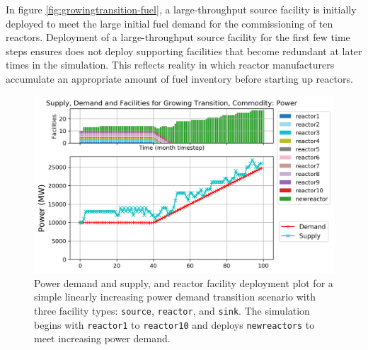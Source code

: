 In figure \ref{fig:growingtransition-fuel},
a large-throughput source facility is initially
deployed to meet the large initial fuel demand for the commissioning 
of ten reactors. 
Deployment of a large-throughput source facility for the 
first few time steps ensures \deploy does not deploy supporting
facilities that become redundant at later times in  
the simulation.
This reflects reality in which reactor manufacturers accumulate
an appropriate amount of fuel inventory before starting 
up reactors. 

\begin{figure}[]
    \centering
    \includegraphics[width=\linewidth]{figures/growingtransition-power.png} 
        \caption{Power demand and supply, and reactor facility deployment plot for  
        a simple linearly increasing power demand transition scenario with 
        three facility types: \texttt{source}, \texttt{reactor}, and \texttt{sink}.
        The simulation begins with \texttt{reactor1} to \texttt{reactor10} and \deploy 
        deploys \texttt{newreactors} to meet increasing power demand. }
        \label{fig:growingtransition-power}
\end{figure}

